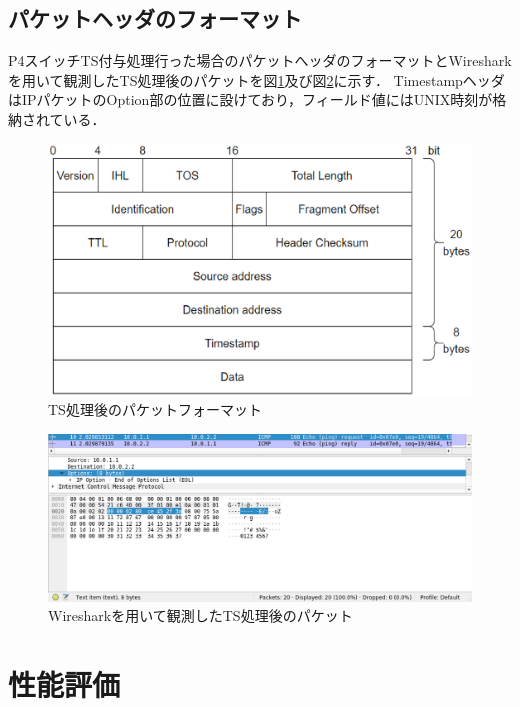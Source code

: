 \documentclass[a4j,11pt]{jreport}
\begin{document}
\section{パケットヘッダのフォーマット}
P4スイッチTS付与処理行った場合のパケットへッダのフォーマットとWiresharkを用いて観測したTS処理後のパケットを図\ref{fig:packet_format}及び図\ref{fig:wireshark}に示す．
TimestampヘッダはIPパケットのOption部の位置に設けており，フィールド値にはUNIX時刻が格納されている．

\begin{figure}[htbp]
  \centering
  \includegraphics[scale=0.65]{data/packet_format.eps}
  \vspace{0mm}
  \caption{TS処理後のパケットフォーマット}
  \label{fig:packet_format}
\end{figure}

\begin{figure}[htbp]
  \centering
  \includegraphics[scale=0.55]{data/wireshark3.eps}
  \vspace{0mm}
  \caption{Wiresharkを用いて観測したTS処理後のパケット}
  \label{fig:wireshark}
\end{figure}


\chapter{性能評価}
\end{document}
